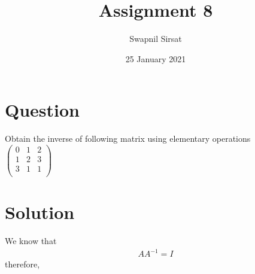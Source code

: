 \documentclass{article}
\title{Assignment 8}
\author{Swapnil Sirsat}
\date{25 January 2021}
\begin{document}
\maketitle

\section*{Question}
Obtain the inverse of following matrix using elementary operations\\
$\begin{pmatrix}
0 & 1 & 2\\
1 & 2 & 3\\
3 & 1 & 1\\
\end{pmatrix}$
\section*{Solution}
We know that
\begin{gather*}
    AA^{-1} = I
\end{gather*}
therefore,
\end{document}
